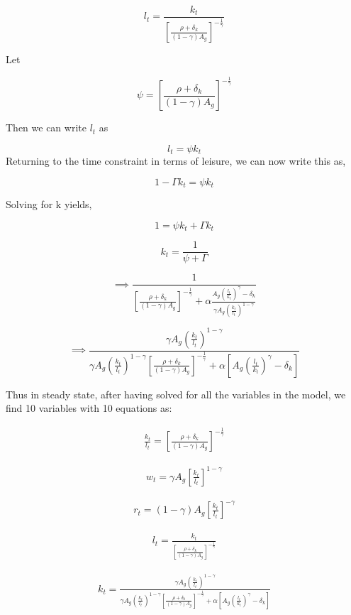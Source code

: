 \documentclass[
  11pt,
  justified]{article}
\begin{document}
\[
l_t = \frac{k_t}{[\frac{\rho + \delta_k}{(1-\gamma) A_g}]^{-\frac{1}{\gamma}}}
\]

Let

\[
\psi = [\frac{\rho + \delta_k}{(1-\gamma) A_g}]^{-\frac{1}{\gamma}}
\]

Then we can write \(l_t\) as

\[
l_t = \psi k_t
\] Returning to the time constraint in terms of leisure, we can now
write this as,

\[
1 - \Gamma k_t =  \psi k_t
\]

Solving for k yields,

\[
1 = \psi k_t + \Gamma k_t
\]

\[
k_t = \frac{1}{\psi + \Gamma} 
\]

\[
\implies \frac{1}{ [\frac{\rho + \delta_k}{(1-\gamma) A_g}]^{-\frac{1}{\gamma}} + \alpha \frac{ A_g (\frac{l_t}{k_t})^{\gamma} - \delta_k}{ \gamma A_g (\frac{k_t}{l_t})^{1-\gamma}}} 
\]

\[
\implies \frac{\gamma A_g (\frac{k_t}{l_t})^{1-\gamma}}{\gamma A_g (\frac{k_t}{l_t})^{1-\gamma} [\frac{\rho + \delta_k}{(1-\gamma) A_g}]^{-\frac{1}{\gamma}} + \alpha [A_g (\frac{l_t}{k_t})^{\gamma} - \delta_k]}
\]

Thus in steady state, after having solved for all the variables in the
model, we find 10 variables with 10 equations as:

\begin{align}
\frac{k_t}{l_t} = [\frac{\rho + \delta_k}{(1-\gamma) A_g}]^{-\frac{1}{\gamma}}  \tag{Capital to labour ratio}
\end{align}

\begin{align}
w_t  = \gamma A_g [\frac{k_t}{l_t}]^{1-\gamma} \tag{Real wage} 
\end{align}

\begin{align}
r_t = (1-\gamma) A_g [\frac{k_t}{l_t}]^{- \gamma} \tag{Real interest rate}
\end{align}

\begin{align}
l_t = \frac{k_t}{[\frac{\rho + \delta_k}{(1-\gamma) A_g}]^{-\frac{1}{\gamma}}} \tag{Labour}
\end{align}

\begin{align}
k_t = \frac{\gamma A_g (\frac{k_t}{l_t})^{1-\gamma}}{\gamma A_g (\frac{k_t}{l_t})^{1-\gamma} [\frac{\rho + \delta_k}{(1-\gamma) A_g}]^{-\frac{1}{\gamma}} + \alpha [A_g (\frac{l_t}{k_t})^{\gamma} - \delta_k]} \tag{Captial}
\end{align}
\end{document}
